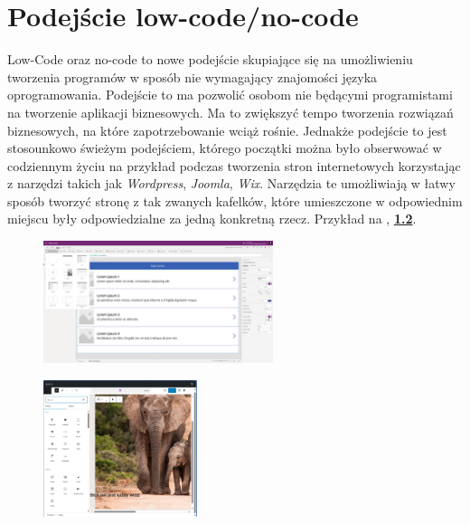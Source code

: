 \chapter{Podejście low-code/no-code}
Low-Code oraz no-code to nowe podejście skupiające się na umożliwieniu tworzenia programów w sposób nie wymagający znajomości języka oprogramowania. Podejście to ma pozwolić osobom nie będącymi programistami na tworzenie aplikacji biznesowych. Ma to zwiększyć tempo tworzenia rozwiązań biznesowych, na które zapotrzebowanie wciąż rośnie. Jednakże podejście to jest stosounkowo świeżym podejściem, którego początki można było obserwować w codziennym życiu na przykład podczas tworzenia stron internetowych korzystając z narzędzi takich jak \textit{Wordpress}, \textit{Joomla}, \textit{Wix}. Narzędzia te umożliwiają w łatwy sposób tworzyć stronę z tak zwanych kafelków, które umieszczone w odpowiednim miejscu były odpowiedzialne za jedną konkretną rzecz\cite{Wordpress2023, Joomla2023, Wix2023}. Przykład na , \textbf{\ref{fig:wp-plat}}.
\begin{figure}[H]
    \centering
    \includegraphics[width=0.6\textwidth]{images/ms_powerapps}
    \label{fig:pa-plat}
\end{figure}

\begin{figure}[H]
    \centering
    \includegraphics[width=0.4\textwidth]{images/slon_wordpress}
    \label{fig:wp-plat}
\end{figure}

